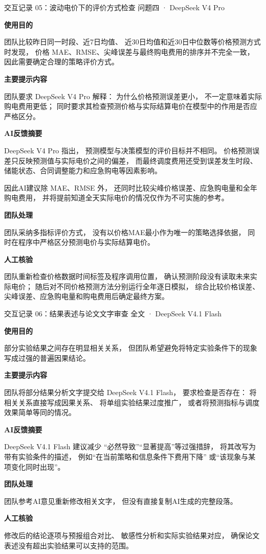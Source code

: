\documentclass[UTF8,a4paper,11pt]{ctexart}
\newcommand{\recorditem}[1]{%
    \par\vspace{0.28em}
    \noindent\textbf{#1}\quad
}
\begin{document}
\begin{recordbox}
{交互记录 05：波动电价下的评价方式检查}
{问题四 · DeepSeek V4 Pro}

\recorditem{使用目的}
团队比较昨日同一时段、近7日均值、
近30日均值和近30日中位数等价格预测方式时发现，
价格 MAE、RMSE、尖峰误差与最终购电费用的排序并不完全一致，
因此需要确定合理的策略评价方式。

\recorditem{主要提示内容}
团队要求 DeepSeek V4 Pro 解释：
为什么价格预测误差更小，
不一定意味着实际购电费用更低；
同时要求其检查预测价格与实际结算电价在模型中的作用是否应严格区分。

\recorditem{AI反馈摘要}
DeepSeek V4 Pro 指出，
预测模型与决策模型的评价目标并不相同。
价格预测误差只反映预测值与实际电价之间的偏差，
而最终调度费用还受到误差发生时段、
储能状态、合同调整能力和应急购电等因素影响。

因此AI建议除 MAE、RMSE 外，
还同时比较尖峰价格误差、应急购电量和全年购电费用，
并将提前知道全天实际电价的情况仅作为不可实施的参考。

\recorditem{团队处理}
团队采纳多指标评价方式，
没有以价格MAE最小作为唯一的策略选择依据，
同时在程序中严格区分预测电价与实际结算电价。

\recorditem{人工核验}
团队重新检查价格数据时间标签及程序调用位置，
确认预测阶段没有读取未来实际电价；
随后对不同价格预测方法分别运行全年逐日模拟，
综合比较价格误差、尖峰误差、应急购电量和购电费用后确定最终方案。

\end{recordbox}

\begin{recordbox}
{交互记录 06：结果表述与论文文字审查}
{全文 · DeepSeek V4.1 Flash}

\recorditem{使用目的}
部分实验结果之间存在明显相关关系，
但团队希望避免将特定实验条件下的现象写成过强的普遍因果结论。

\recorditem{主要提示内容}
团队将部分结果分析文字提交给 DeepSeek V4.1 Flash，
要求检查是否存在：
将相关关系直接写成因果关系、
将单组实验结果过度推广，
或者将预测指标与调度效果简单等同的情况。

\recorditem{AI反馈摘要}
DeepSeek V4.1 Flash 建议减少
“必然导致”“显著提高”等过强措辞，
将其改写为带有实验条件的描述，
例如“在当前策略和信息条件下费用下降”
或“该现象与某项变化同时出现”。

\recorditem{团队处理}
团队参考AI意见重新修改相关文字，
但没有直接复制AI生成的完整段落。

\recorditem{人工核验}
修改后的结论逐项与预报组合对比、
敏感性分析和实际实验结果对应，
确保论文表述没有超出实验结果可以支持的范围。

\end{recordbox}
\end{document}
